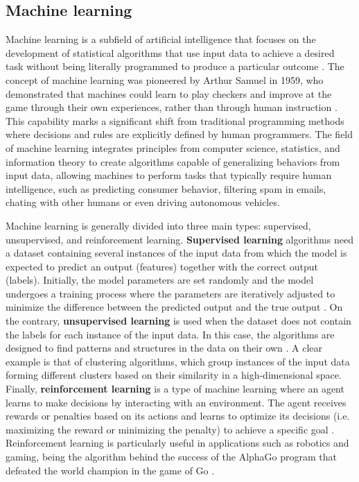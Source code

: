 \subsection{\label{sec:Machine learning} Machine learning}

Machine learning is a subfield of artificial intelligence that focuses on the
development of statistical algorithms that use input data to achieve a desired
task without being literally programmed to produce a particular outcome
\cite{Michalski2013,ElNaqa2015}. The concept of machine learning was pioneered
by Arthur Samuel in 1959, who demonstrated that machines could learn to play
checkers and improve at the game through their own experiences, rather than
through human instruction \cite{Samuel2000}. This capability marks a
significant shift from traditional programming methods where decisions and
rules are explicitly defined by human programmers. The field of machine
learning integrates principles from computer science, statistics, and
information theory to create algorithms capable of generalizing behaviors from
input data, allowing machines to perform tasks that typically require human
intelligence, such as predicting consumer behavior, filtering spam in emails,
chating with other humans or even driving autonomous vehicles.

Machine learning is generally divided into three main types: supervised,
unsupervised, and reinforcement learning. \textbf{Supervised learning}
algorithms need a dataset containing several instances of the input data from
which the model is expected to predict an output (features) together with the
correct output (labels). Initially, the model parameters are set randomly and
the model undergoes a training process where the parameters are iteratively
adjusted to minimize the difference between the predicted output and the true
output \cite{Nielsen2015}. On the contrary, \textbf{unsupervised learning} is
used when the dataset does not contain the labels for each instance of the
input data. In this case, the algorithms are designed to find patterns and
structures in the data on their own \cite{Duda2006}. A clear example is that of
clustering algorithms, which group instances of the input data forming
different clusters based on their similarity in a high-dimensional space.
Finally, \textbf{reinforcement learning} is a type of machine learning where an
agent learns to make decisions by interacting with an environment. The agent
receives rewards or penalties based on its actions and learns to optimize its
decisions (i.e. maximizing the reward or minimizing the penalty) to achieve a
specific goal \cite{Sutton2018}. Reinforcement learning is particularly useful
in applications such as robotics and gaming, being the algorithm behind the
success of the AlphaGo program that defeated the world champion in the game of
Go \cite{Silver2017}.

